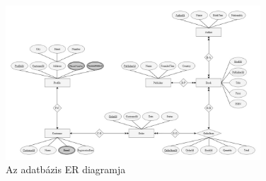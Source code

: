 \documentclass{article}
\begin{document}
    \begin{figure}[h!]
      \centering
      \includegraphics[width=0.85\textwidth]{WO02D7_ER.jpg}
      \caption{Az adatbázis ER diagramja}
    \end{figure}
\end{document}
